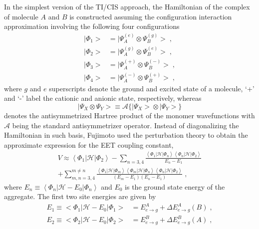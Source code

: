 In the simplest version of the TI/CIS approach, the Hamiltonian of the 
complex of molecule $A$ and $B$ is constructed assuming the configuration interaction
approximation involving the following four configurations
%
\begin{subequations}
\begin{align}
 \big| \Phi_1 \big> &= \big| \Psi_A^{(e)} \otimes \Psi_B^{(g)} \big> \;, \\
 \big| \Phi_2 \big> &= \big| \Psi_A^{(g)} \otimes \Psi_B^{(e)} \big> \;, \\
 \big| \Phi_3 \big> &= \big| \Psi_A^{(+)} \otimes \Psi_B^{(-)} \big> \;, \\
 \big| \Phi_4 \big> &= \big| \Psi_A^{(-)} \otimes \Psi_B^{(+)} \big> \;,
\end{align}
\end{subequations}
%
where $g$ and $e$ superscripts denote the ground and excited state of a molecule,
`+' and `-' label the cationic and anionic state, respectively, 
whereas
%
\begin{equation}
\big| \Psi_X \otimes \Psi_Y \big> \equiv \mathscr{A} \Big\{ \big| \Psi_X \big> \otimes \big| \Psi_Y \big> \Big\}
\end{equation}
%
denotes the antisymmetrized Hartree product
of the monomer wavefunctions with $\mathscr{A}$ being the standard antisymmetrizer operator. 
Instead of diagonalizing the Hamiltonian in such basis,
Fujimoto used the perturbation theory to obtain the approximate expression for the EET coupling
constant,
%
\begin{multline}\label{e:v0-fujimoto}
  V \approx \left< \Phi_1 \vert \mathscr{H} \vert \Phi_2 \right> 
   - \sum_{n=3,4} \frac{\left< \Phi_1 \vert \mathscr{H} \vert \Phi_n \right> 
                        \left< \Phi_n \vert \mathscr{H} \vert \Phi_2 \right>}{E_n - E_1} \\
   + \sum_{m,n=3,4}^{m\ne n}
     \frac{\left< \Phi_1 \vert \mathscr{H} \vert \Phi_m \right>
           \left< \Phi_m \vert \mathscr{H} \vert \Phi_n \right>
           \left< \Phi_n \vert \mathscr{H} \vert \Phi_2 \right>}{(E_m-E_1)(E_n-E_1)} \;,
\end{multline}
%
where $E_n \equiv \left< \Phi_n \vert \mathscr{H} -E_{0} \vert \Phi_n \right>$
and $E_0$ is the ground state energy of the aggregate.
The first two site energies are given by
%
\begin{subequations}
\begin{align}
 E_1 \equiv \big< \Phi_1 \big| \mathscr{H} -E_{0} \big| \Phi_1 \big> &= E^A_{e\rightarrow g} 
  + \Delta E^A_{e\rightarrow g}(B) \;, \\
 E_2 \equiv \big< \Phi_2 \big| \mathscr{H} -E_{0} \big| \Phi_2 \big> &= E^B_{e\rightarrow g} 
  + \Delta E^B_{e\rightarrow g}(A) \;,
\end{align}
\end{subequations}
